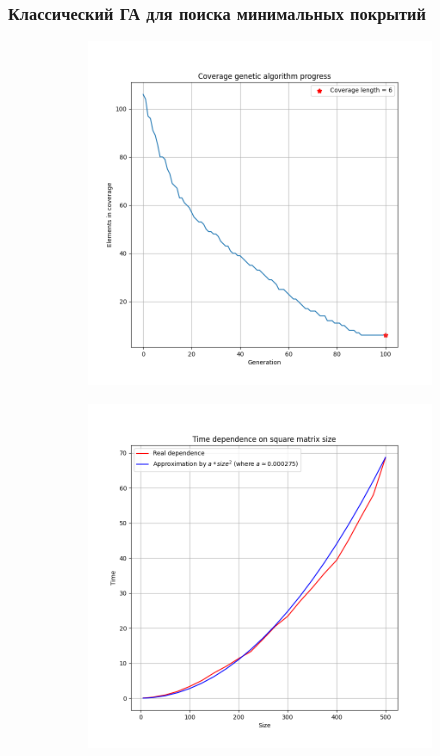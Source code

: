 \documentclass[
	11pt,
]{beamer}
\begin{document}
\begin{frame}
	\frametitle{Классический ГА для поиска минимальных покрытий}
	\begin{figure}
		\centering
		\begin{subfigure}{.5\textwidth}
		  \centering
		  \includegraphics[width=1.\linewidth]{./images/Typical_progress_plot.png}
		  \label{fig:sub1}
		\end{subfigure}%
		\begin{subfigure}{.5\textwidth}
		  \centering
		  \includegraphics[width=1.\linewidth]{./images/Time_plot.png}
		  \label{fig:sub2}
		\end{subfigure}
		\label{fig:test}
		\end{figure}
\end{frame}
\end{document}
